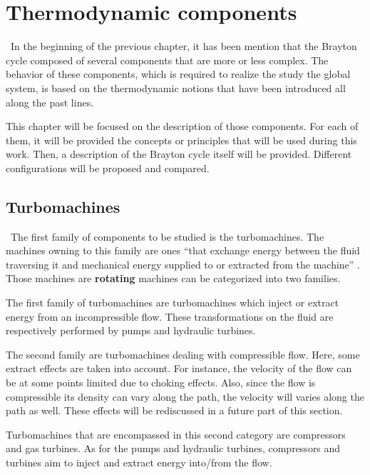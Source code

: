 \graphicspath{{Chapitre_3/Images/}}
\chapter{Thermodynamic components}\label{C3}
\quad\ In the beginning of the previous chapter, it has been mention that the Brayton cycle composed of several components that are more or less complex. The behavior of these components, which is required to realize the study the global system, is based on the thermodynamic notions that have been introduced all along the past lines.

This chapter will be focused on the description of those components. For each of them, it will be provided the concepts or principles that will be used during this work. Then, a description of the Brayton cycle itself will be provided. Different configurations will be proposed and compared.
\section{Turbomachines}
\quad\ The first family of components to be studied is the turbomachines. The machines owning to this family are ones “that exchange energy between the
fluid traversing it and mechanical energy supplied to or extracted from the machine” \cite{Hillewaert2019}. Those machines are \textbf{rotating} machines
can be categorized into two families.

The first family of turbomachines are turbomachines which inject or extract energy from an incompressible flow. These transformations on the fluid  are respectively performed by pumps and hydraulic turbines.

The second family are turbomachines dealing with compressible flow. Here, some extract effects are taken into account. For instance, the velocity of the flow can be at some points limited due to choking effects. Also, since the flow is compressible its density can vary along the path, the velocity will varies along the path as well. These effects will be rediscussed in a future part of this section.

Turbomachines that are encompassed in this second category are compressors and gas turbines. As for the pumps and hydraulic turbines, compressors and turbines aim to inject and extract energy into/from the flow.

